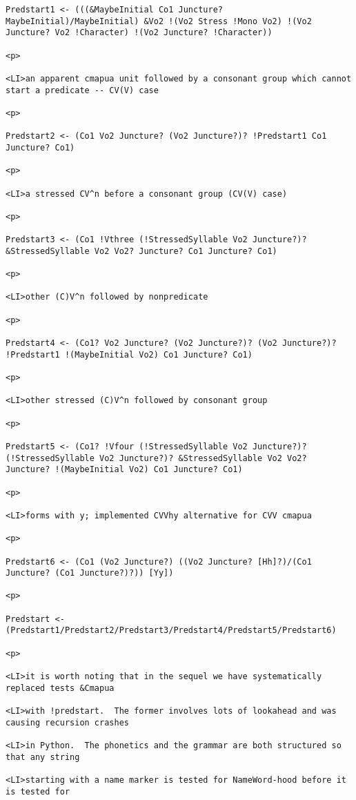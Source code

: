 \documentclass[12pt]{article}
\begin{document}
\begin{lstlisting}
Predstart1 <- (((&MaybeInitial Co1 Juncture? MaybeInitial)/MaybeInitial) &Vo2 !(Vo2 Stress !Mono Vo2) !(Vo2 Juncture? Vo2 !Character) !(Vo2 Juncture? !Character))

<p>

<LI>an apparent cmapua unit followed by a consonant group which cannot start a predicate -- CV(V) case

<p>

Predstart2 <- (Co1 Vo2 Juncture? (Vo2 Juncture?)? !Predstart1 Co1 Juncture? Co1)

<p>

<LI>a stressed CV^n before a consonant group (CV(V) case)

<p>

Predstart3 <- (Co1 !Vthree (!StressedSyllable Vo2 Juncture?)? &StressedSyllable Vo2 Vo2? Juncture? Co1 Juncture? Co1)

<p>

<LI>other (C)V^n followed by nonpredicate

<p>

Predstart4 <- (Co1? Vo2 Juncture? (Vo2 Juncture?)? (Vo2 Juncture?)? !Predstart1 !(MaybeInitial Vo2) Co1 Juncture? Co1)

<p>

<LI>other stressed (C)V^n followed by consonant group

<p>

Predstart5 <- (Co1? !Vfour (!StressedSyllable Vo2 Juncture?)? (!StressedSyllable Vo2 Juncture?)? &StressedSyllable Vo2 Vo2? Juncture? !(MaybeInitial Vo2) Co1 Juncture? Co1)

<p>

<LI>forms with y; implemented CVVhy alternative for CVV cmapua

<p>

Predstart6 <- (Co1 (Vo2 Juncture?) ((Vo2 Juncture? [Hh]?)/(Co1 Juncture? (Co1 Juncture?)?)) [Yy])

<p>

Predstart <- (Predstart1/Predstart2/Predstart3/Predstart4/Predstart5/Predstart6)

<p>

<LI>it is worth noting that in the sequel we have systematically replaced tests &Cmapua

<LI>with !predstart.  The former involves lots of lookahead and was causing recursion crashes

<LI>in Python.  The phonetics and the grammar are both structured so that any string

<LI>starting with a name marker is tested for NameWord-hood before it is tested for


\end{lstlisting}
\end{document}
